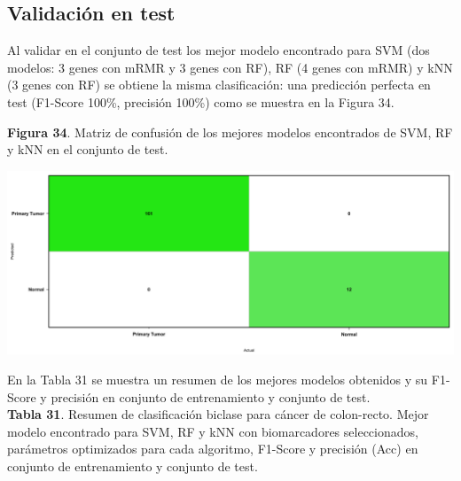 \subsection{Validación en test}

Al validar en el conjunto de test los mejor modelo encontrado para SVM (dos modelos: 3 genes con mRMR y 3 genes con RF), RF (4 genes con mRMR) y kNN (3 genes con RF) se obtiene la misma clasificación: una predicción perfecta en test (F1-Score 100\%, precisión 100\%) como se muestra en la Figura 34.\\

\begin{center}
\textbf{Figura 34}. Matriz de confusión de los mejores modelos encontrados de SVM, RF y kNN en el conjunto de test.
\end{center}

\begin{center}
	\includegraphics[width=1\textwidth]{figuras/34_cr_biclase_18_svm_matriz_confusion_mejor_metodo.png} 
\end{center}

En la Tabla 31 se muestra un resumen de los mejores modelos obtenidos y su F1-Score y precisión en conjunto de entrenamiento y conjunto de test.\\

\textbf{Tabla 31}. Resumen de clasificación biclase para cáncer de colon-recto. Mejor modelo encontrado para SVM, RF y kNN con biomarcadores seleccionados, parámetros optimizados para cada algoritmo, F1-Score y precisión (Acc) en conjunto de entrenamiento y conjunto de test.

